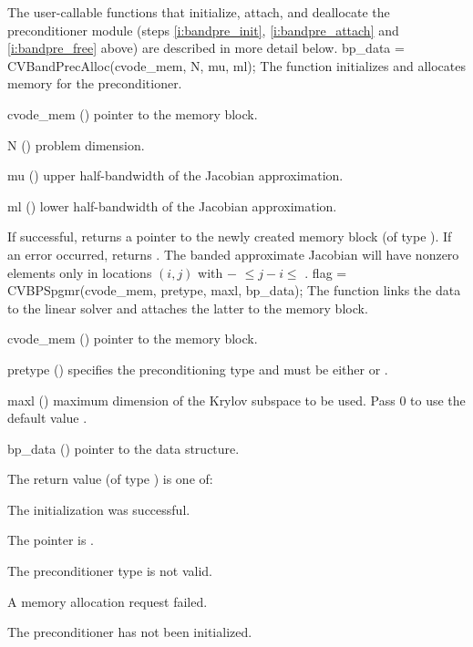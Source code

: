 The user-callable functions that initialize, attach, and deallocate
the {\cvbandpre} preconditioner module (steps \ref{i:bandpre_init},
\ref{i:bandpre_attach} and \ref{i:bandpre_free} above) are described
in more detail below.
{
  bp\_data = CVBandPrecAlloc(cvode\_mem, N, mu, ml);
}
{
  The function  initializes and allocates
  memory for the {\cvbandpre} preconditioner.
}
{
  \begin{args}
  \item[cvode\_mem] ()
    pointer to the {\cvodes} memory block.
  \item[N] ()
    problem dimension.
  \item[mu] ()
    upper half-bandwidth of the Jacobian approximation.
  \item[ml] ()
    lower half-bandwidth of the Jacobian approximation.
  \end{args}
}
{
  If successful,  returns a pointer to the newly created 
  {\cvbandpre} memory block (of type ).
  If an error occurred,  returns .
}
{
  The banded approximate Jacobian will have nonzero elements only in locations
  $(i,j)$ with $-$ $\leq j-i \leq$ .
}
{
  flag = CVBPSpgmr(cvode\_mem, pretype, maxl, bp\_data);
}
{
  The function  links the {\cvbandpre} data to the
  {\cvspgmr} linear solver and attaches the latter to the {\cvodes}
  memory block.
}
{
  \begin{args}
  \item[cvode\_mem] ()
    pointer to the {\cvodes} memory block.
  \item[pretype] ()
    specifies the preconditioning type and must be either
     or .
  \item[maxl] ()
    maximum dimension of the Krylov subspace to be used. Pass $0$ to use the 
    default value .
  \item[bp\_data] ()
    pointer to the {\cvbandpre} data structure.
  \end{args}
}
{
  The return value  (of type ) is one of:
  \begin{args}
  \item[\Id{CVSPGMR\_SUCCESS}] 
    The {\cvspgmr} initialization was successful.
  \item[\Id{CVSPGMR\_MEM\_NULL}]
    The  pointer is .
  \item[\Id{CVSPGMR\_ILL\_INPUT}]
    The preconditioner type  is not valid.
  \item[\Id{CVSPGMR\_MEM\_FAIL}]
    A memory allocation request failed.
  \item[\Id{CVBANDPRE\_PDATA\_NULL}]
    The {\cvbandpre} preconditioner has not been initialized.
  \end{args}
}
